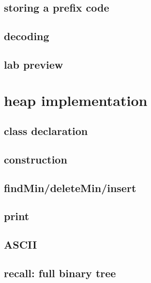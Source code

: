 \subsection{storing a prefix code}

\subsection{decoding}

\subsection{lab preview}

\section{heap implementation}

\subsection{class declaration}

\subsection{construction}

\subsection{findMin/deleteMin/insert}

\subsection{print}



\subsection{ASCII}

\subsection{recall: full binary tree}


